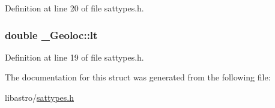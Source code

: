 Definition at line 20 of file sattypes.\-h.

\hypertarget{struct___geoloc_a536e2886145996c4c5cbe460217fe927}{
\subsubsection[{lt}]{\setlength{\rightskip}{0pt plus 5cm}double \-\_\-\-Geoloc\-::lt}}\label{struct___geoloc_a536e2886145996c4c5cbe460217fe927}


Definition at line 19 of file sattypes.\-h.



The documentation for this struct was generated from the following file\-:\begin{DoxyCompactItemize}
\item 
libastro/\hyperlink{sattypes_8h}{sattypes.\-h}\end{DoxyCompactItemize}
